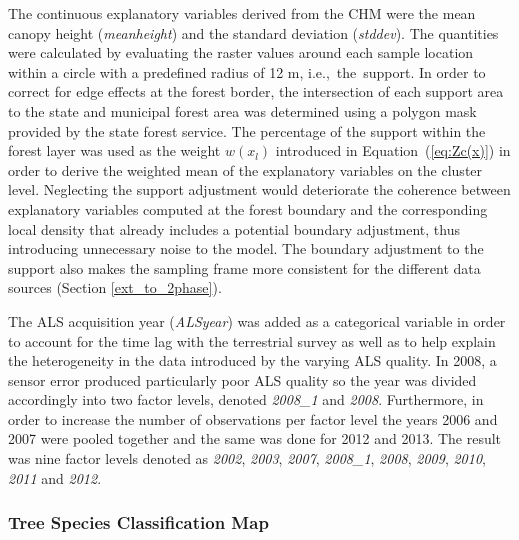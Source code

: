 \documentclass[remotesensing,article,accept,moreauthors,pdftex,10pt,a4paper]{Definitions/mdpi}
\begin{document}
The continuous explanatory variables derived from the CHM were the mean canopy height (\textit{meanheight}) and the standard deviation (\textit{stddev}). The quantities were calculated by evaluating the raster values around each sample location within a circle with a predefined radius of 12 m, i.e.,~the~support. In order to correct for edge effects at the forest border, the intersection of each support area to the state and municipal forest area was determined using a polygon mask provided by the state forest service. The percentage of the support within the forest layer was used as the weight $w(x_l)$ introduced in Equation~(\ref{eq:Zc(x)}) in order to derive the weighted mean of the explanatory variables on the cluster level. Neglecting the support adjustment would deteriorate the coherence between explanatory variables computed at the forest boundary and the corresponding local density that already includes a potential boundary adjustment, thus introducing unnecessary noise to the model. The boundary adjustment to the support also makes the sampling frame more consistent for the different data sources (Section \ref{ext_to_2phase}).\par
The ALS acquisition year (\textit{ALSyear}) was added as a categorical variable in order to account for the time lag with the terrestrial survey as well as to help explain the heterogeneity in the data introduced by the varying ALS quality. In 2008, a sensor error produced particularly poor ALS quality so the year was divided accordingly into two factor levels, denoted \textit{2008\_1} and \textit{2008}. Furthermore, in order to increase the number of observations per factor level the years 2006 and 2007 were pooled together and the same was done for 2012 and 2013.  The result was nine factor levels denoted as \textit{2002}, \textit{2003}, \textit{2007}, \textit{2008\_1}, \textit{2008}, \textit{2009}, \textit{2010}, \textit{2011} and \textit{2012}.


\subsubsection{Tree Species Classification Map}
\end{document}
